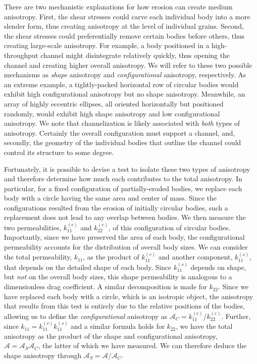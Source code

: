 \documentclass[3p]{elsarticle}
\newcommand{\edit}[1]{{\color{red} #1}}
\newcommand{\anis}{\mathcal{A}}
\begin{document}
There are two mechanistic explanations for how erosion can create medium anisotropy. First, the shear stresses could carve each individual body into a more slender form, thus creating anisotropy at the level of individual grains. Second, the shear stresses could preferentially remove certain bodies before others, thus creating large-scale anisotropy. For example, a body positioned in a high-throughput channel might disintegrate relatively quickly, thus opening the channel and creating higher overall anisotropy. We will refer to these two possible mechanisms as {\em shape} anisotropy and {\em configurational} anisotropy, respectively. As an extreme example, a tightly-packed horizontal row of circular bodies would exhibit high configurational anisotropy but no shape anisotropy. Meanwhile, an array of highly eccentric ellipses, all oriented horizontally but positioned randomly, would exhibit high shape anisotropy and low configurational anisotropy. We note that channelization is likely associated with {\em both} types of anisotropy. Certainly the overall configuration must support a channel, and, secondly, the geometry of the individual bodies that outline the channel could control its structure to some degree.

Fortunately, it is possible to devise a test to isolate these two types of anisotropy and therefore determine how much each contributes to the total anisotropy. In particular, for a fixed configuration of partially-eroded bodies, we replace each body with a circle having the same area and center of mass. Since the configurations resulted from the erosion of initially circular bodies, such a replacement does not lead to any overlap between bodies. We then measure the two permeabilities, $k_{11}^{(c)}$ and $ k_{22}^{(c)}$, of this configuration of circular bodies. 
\edit{Importantly, since we have preserved the area of each body, the configurational permeability accounts for the distribution of overall body sizes. We can consider the total permeability, $k_{11}$, as the product of $k_{11}^{(c)}$ and another component, $k_{11}^{(s)}$, that depends on the detailed shape of each body. Since $k_{11}^{(s)}$ depends on shape, but {\em not} on the overall body sizes, this shape permeability is analogous to a dimensionless drag coefficient. A similar decomposition is made for $k_{22}$. Since we have replaced each body with a circle, which is an isotropic object, the anisotropy that results from this test is entirely due to the relative positions of the bodies, allowing us to define the {\em configurational} anisotropy as $\anis_C = k_{11}^{(c)} / k_{22}^{(c)}$.  Further, since $k_{11} = k_{11}^{(c)} k_{11}^{(s)}$ and a similar formula holds for $k_{22}$, we have the total anisotropy as the product of the shape and configurational anisotropy, $\anis = \anis_S \anis_C$, the latter of which we have measured. We can therefore deduce the shape anisotropy through $\anis_S = \anis/\anis_C$.
}
\end{document}
